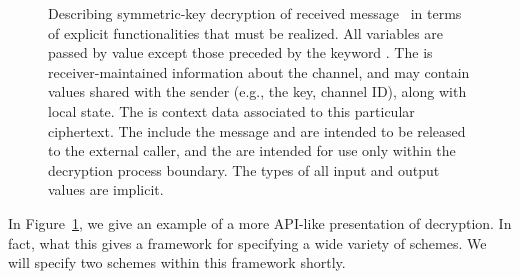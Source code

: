 \begin{figure}[t]
  \begin{center}
  \end{center}
%
\caption{Describing symmetric-key decryption of received message~ in terms of
  explicit functionalities that must be realized. All variables are passed by
  value except those preceded by the keyword . The
   is receiver-maintained information about the channel,
  and may contain values shared with the sender (e.g., the key, channel ID),
  along with local state.  The  is context data associated
  to this particular ciphertext. The  include the message
  and are intended to be released to the external caller, and the
   are intended for use only within the decryption process
  boundary.  The types of all input and output values are implicit.}
\label{fig:syntax-api-example}
\end{figure}
%
In Figure~\ref{fig:syntax-api-example}, we give an example of a more
API-like presentation of decryption.  In fact, what this gives a
framework for specifying a wide variety of schemes.  We will specify
two schemes within this framework shortly.

